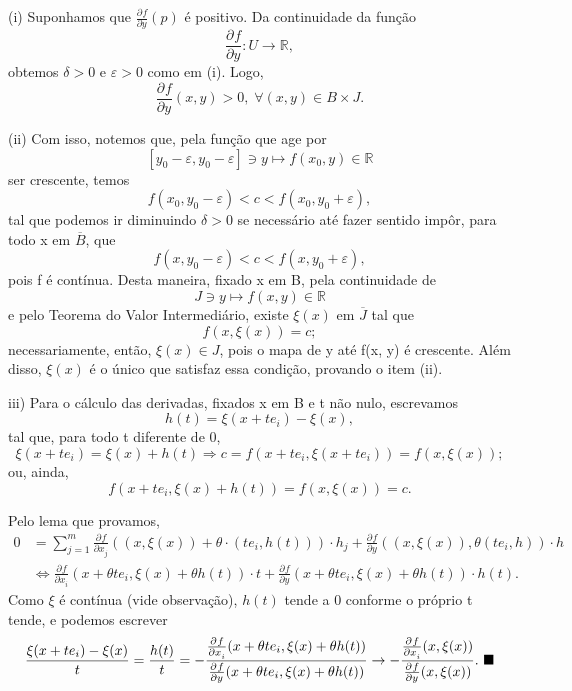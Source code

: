 \documentclass[../analysisII_notes.tex]{subfiles}
\begin{document}
\begin{proof*}
	(i) Suponhamos que \(\frac{\partial^{}f}{\partial y^{}}(p)\) é positivo. Da continuidade da função
	\[
		\frac{\partial^{}f}{\partial y^{}}:U\rightarrow \mathbb{R},
	\]
	obtemos \(\delta > 0 \) e \(\varepsilon  > 0\) como em (i). Logo,
	\[
		\frac{\partial^{}f}{\partial y^{}}(x, y)>0,\; \forall (x, y)\in B \times J.
	\]

	(ii) Com isso, notemos que, pela função que age por
	\[
		[y_{0}-\varepsilon , y_{0}-\varepsilon ]\ni y \mapsto f(x_{0}, y)\in \mathbb{R}
	\]
	ser crescente, temos
	\[
		f(x_{0}, y_{0}-\varepsilon ) < c < f(x_{0}, y_{0}+\varepsilon ),
	\]
	tal que podemos ir diminuindo \(\delta  > 0\) se necessário até fazer sentido impôr, para todo x em \(\overline{B}\), que
	\[
		f(x, y_{0}-\varepsilon ) < c < f(x, y_{0}+\varepsilon ),
	\]
	pois f é contínua. Desta maneira, fixado x em B, pela continuidade de
	\[
		J\ni y \mapsto f(x, y)\in \mathbb{R}
	\]
	e pelo Teorema do Valor Intermediário, existe \(\xi (x)\) em \(\overline{J}\) tal que
	\[
		f(x, \xi (x)) = c;
	\]
	necessariamente, então, \(\xi (x)\in J\), pois o mapa de y até f(x, y) é crescente. Além disso, \(\xi (x)\) é o único que satisfaz essa condição, provando o item (ii).

	iii) Para o cálculo das derivadas, fixados x em B e t não nulo, escrevamos
	\[
		h(t) = \xi (x+te_{i}) - \xi (x),
	\]
	tal que, para todo t diferente de 0,
	\[
		\xi (x + t e_{i}) = \xi (x) + h(t) \Rightarrow c = f(x+t e_{i}, \xi (x + t e_{i})) = f(x, \xi (x));
	\]
	ou, ainda,
	\[
		f(x+t e_{i}, \xi (x) + h(t)) = f(x, \xi (x)) = c.
	\]

	Pelo lema que provamos,
	\begin{align*}
		0 & = \sum\limits_{j=1}^{m}\frac{\partial^{}f}{\partial x_{j}^{}}((x, \xi (x)) + \theta \cdot (te_{i}, h(t)))\cdot h_{j} + \frac{\partial^{}f}{\partial y^{}}((x, \xi (x)), \theta (t e_{i}, h))\cdot h  \\
		  & \Longleftrightarrow \frac{\partial^{}f}{\partial x_{i}^{}}(x+\theta t e_{i}, \xi (x) + \theta h(t)) \cdot t + \frac{\partial^{}f}{\partial y^{}}(x+\theta t e_{i}, \xi (x) + \theta h(t))\cdot h(t).
	\end{align*}
	Como \(\xi \) é contínua (vide observação), \(h(t)\) tende a 0 conforme o próprio t tende, e podemos escrever
	\[
		\frac{\xi (x + te_{i})-\xi (x)}{t} = \frac{h(t)}{t} = - \frac{\frac{\partial^{}f}{\partial x_{i}^{}}(x+\theta t e_{i}, \xi (x) + \theta h(t))}{\frac{\partial^{}f}{\partial y^{}}(x + \theta te_{i}, \xi (x) + \theta h(t))} \rightarrow -\frac{\frac{\partial^{}f}{\partial x_{i}^{}}(x, \xi (x))}{\frac{\partial^{}f}{\partial y^{}}(x, \xi (x))}. \text{ $\blacksquare$}
	\]
\end{proof*}
\end{document}
